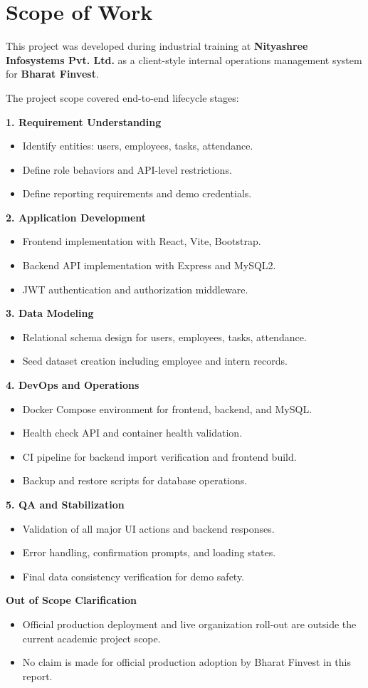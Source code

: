 \chapter{Scope of Work}

This project was developed during industrial training at \textbf{Nityashree Infosystems Pvt. Ltd.} as a client-style internal operations management system for \textbf{Bharat Finvest}.

The project scope covered end-to-end lifecycle stages:

\textbf{1. Requirement Understanding}
\begin{itemize}[leftmargin=1.3cm]
\item Identify entities: users, employees, tasks, attendance.
\item Define role behaviors and API-level restrictions.
\item Define reporting requirements and demo credentials.
\end{itemize}

\textbf{2. Application Development}
\begin{itemize}[leftmargin=1.3cm]
\item Frontend implementation with React, Vite, Bootstrap.
\item Backend API implementation with Express and MySQL2.
\item JWT authentication and authorization middleware.
\end{itemize}

\textbf{3. Data Modeling}
\begin{itemize}[leftmargin=1.3cm]
\item Relational schema design for users, employees, tasks, attendance.
\item Seed dataset creation including employee and intern records.
\end{itemize}

\textbf{4. DevOps and Operations}
\begin{itemize}[leftmargin=1.3cm]
\item Docker Compose environment for frontend, backend, and MySQL.
\item Health check API and container health validation.
\item CI pipeline for backend import verification and frontend build.
\item Backup and restore scripts for database operations.
\end{itemize}

\textbf{5. QA and Stabilization}
\begin{itemize}[leftmargin=1.3cm]
\item Validation of all major UI actions and backend responses.
\item Error handling, confirmation prompts, and loading states.
\item Final data consistency verification for demo safety.
\end{itemize}

\textbf{Out of Scope Clarification}
\begin{itemize}[leftmargin=1.3cm]
\item Official production deployment and live organization roll-out are outside the current academic project scope.
\item No claim is made for official production adoption by Bharat Finvest in this report.
\end{itemize}
